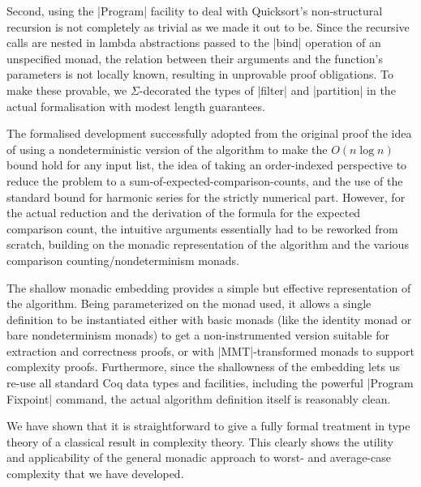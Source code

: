 \documentclass[runningheads]{llncs}
\begin{document}
Second, using the |Program| facility to deal with Quicksort's non-structural recursion is not completely as trivial as we made it out to be. Since the recursive calls are nested in lambda abstractions passed to the |bind| operation of an unspecified monad, the relation between their arguments and the function's parameters is not locally known, resulting in unprovable proof obligations. To make these provable, we $\Sigma$-decorated the types of |filter| and |partition| in the actual formalisation with modest length guarantees.

The formalised development successfully adopted from the original proof the idea of using a nondeterministic version of the algorithm to make the $O(n \log n)$ bound hold for any input list, the idea of taking an order-indexed perspective to reduce the problem to a sum-of-expected-comparison-counts, and the use of the standard bound for harmonic series for the strictly numerical part. However, for the actual reduction and the derivation of the formula for the expected comparison count, the intuitive arguments essentially had to be reworked from scratch, building on the monadic representation of the algorithm and the various comparison counting/nondeterminism monads.

The shallow monadic embedding provides a simple but effective representation of the algorithm. Being parameterized on the monad used, it allows a single definition to be instantiated either with basic monads (like the identity monad or bare nondeterminism monads) to get a non-instrumented version suitable for extraction and correctness proofs, or with |MMT|-transformed monads to support complexity proofs. Furthermore, since the shallowness of the embedding lets us re-use all standard Coq data types and facilities, including the powerful |Program Fixpoint| command, the actual algorithm definition itself is reasonably clean.

We have shown that it is straightforward to give a fully formal treatment in type theory of a classical result in complexity theory. This clearly shows the utility and applicability of the general monadic 
approach to worst- and average-case complexity that we have developed. 



\end{document}
